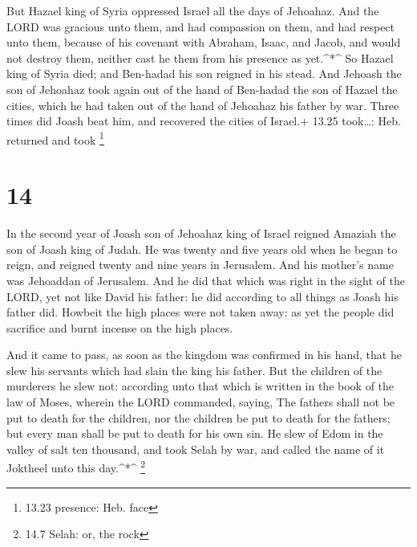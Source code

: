  But Hazael king of Syria oppressed Israel all the days of
Jehoahaz.  And the LORD was gracious unto them, and had
compassion on them, and had respect unto them, because of his covenant
with Abraham, Isaac, and Jacob, and would not destroy them, neither cast
he them from his presence as yet.\^{}*\^{}  So Hazael king
of Syria died; and Ben-hadad his son reigned in his stead. 
And Jehoash the son of Jehoahaz took again out of the hand of Ben-hadad
the son of Hazael the cities, which he had taken out of the hand of
Jehoahaz his father by war. Three times did Joash beat him, and
recovered the cities of Israel.+ 13.25 took\ldots: Heb. returned and
took \footnote{13.23 presence: Heb. face}

\hypertarget{section-13}{%
\section{14}\label{section-13}}

 In the second year of Joash son of Jehoahaz king of Israel
reigned Amaziah the son of Joash king of Judah.  He was
twenty and five years old when he began to reign, and reigned twenty and
nine years in Jerusalem. And his mother's name was Jehoaddan of
Jerusalem.  And he did that which was right in the sight of
the LORD, yet not like David his father: he did according to all things
as Joash his father did.  Howbeit the high places were not
taken away: as yet the people did sacrifice and burnt incense on the
high places.

 And it came to pass, as soon as the kingdom was confirmed
in his hand, that he slew his servants which had slain the king his
father.  But the children of the murderers he slew not:
according unto that which is written in the book of the law of Moses,
wherein the LORD commanded, saying, The fathers shall not be put to
death for the children, nor the children be put to death for the
fathers; but every man shall be put to death for his own sin.
 He slew of Edom in the valley of salt ten thousand, and
took Selah by war, and called the name of it Joktheel unto this
day.\^{}*\^{} \footnote{14.7 Selah: or, the rock}

